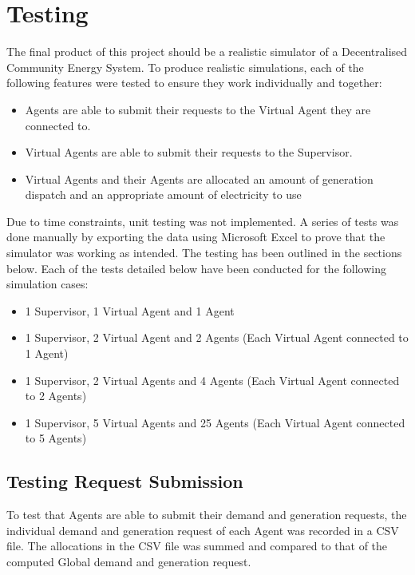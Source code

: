 \chapter{Testing}
\label{Testing}

The final product of this project should be a realistic simulator of a Decentralised Community Energy System. To produce realistic simulations, each of the following features were tested to ensure they work individually and together:

\begin{itemize}
\item Agents are able to submit their requests to the Virtual Agent they are connected to.
\item Virtual Agents are able to submit their requests to the Supervisor.
\item Virtual Agents and their Agents are allocated an amount of generation dispatch and an appropriate amount of electricity to use 
\end{itemize}

Due to time constraints, unit testing was not implemented. A series of tests was done manually by exporting the data using Microsoft Excel to prove that the simulator was working as intended. The testing has been outlined in the sections below. Each of the tests detailed below have been conducted for the following simulation cases:

\begin{itemize}
	\item 1 Supervisor, 1 Virtual Agent and 1 Agent
	\item 1 Supervisor, 2 Virtual Agent and 2 Agents (Each Virtual Agent connected to 1 Agent)
	\item 1 Supervisor, 2 Virtual Agents and 4 Agents (Each Virtual Agent connected to 2 Agents)
	\item 1 Supervisor, 5 Virtual Agents and 25 Agents (Each Virtual Agent connected to 5 Agents)
\end{itemize}

\section*{Testing Request Submission} %
To test that Agents are able to submit their demand and generation requests, the individual demand and generation request of each Agent was recorded in a CSV file. The allocations in the CSV file was summed and compared to that of the computed Global demand and generation request.

